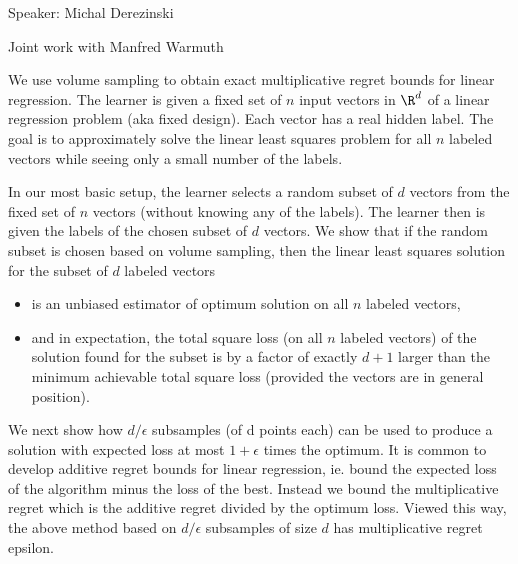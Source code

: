 \def\filepath{C:/Users/oldhe/Dropbox/Math/templates}






\pagestyle{fancy}
\chead{} 
\rhead{} 
\lfoot{} 
\cfoot{\thepage} 
\rfoot{} 
\renewcommand{\headrulewidth}{.3pt} 
\setlength\voffset{0in}
\setlength\textheight{648pt}





Speaker: Michal Derezinski

Joint work with Manfred Warmuth

We use volume sampling to obtain exact multiplicative
regret bounds for linear regression.
The learner is given a fixed set of $n$ input vectors in $\R^d$ of a
linear regression problem (aka fixed design).
Each vector has a real hidden label. The goal is
to approximately solve the linear least squares problem for all $n$
labeled vectors while seeing only a small number of the labels.

In our most basic setup, the
learner selects a random subset of $d$ vectors from
the fixed set of $n$ vectors (without knowing any of the labels).
The learner then is given the labels of the chosen subset of $d$ vectors.
We show that if the random subset is chosen based on volume sampling,
then the linear least squares solution for the subset of $d$ labeled vectors
\begin{itemize}
\item
is an unbiased estimator of optimum solution on all $n$ labeled vectors,
\item
and in expectation, the total square loss (on all $n$ labeled vectors)
of the solution found for the subset is by a factor of exactly $d+1$ larger
than the minimum achievable total square loss
(provided the vectors are in general position).
\end{itemize}
We next show how $d/\epsilon$ subsamples (of d points each) can be
used to produce a solution with expected loss at most $1+\epsilon$
times the optimum. It is common to develop additive regret bounds
for linear regression, ie. bound the expected loss of the algorithm
minus the loss of the best.
Instead we bound the multiplicative regret which
is the additive regret divided by the optimum loss. Viewed this way,
the above method based on $d/\epsilon$ subsamples of size $d$ has
multiplicative regret epsilon.

